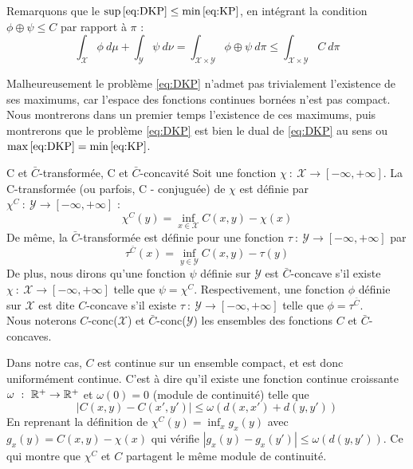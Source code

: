 \documentclass[a4paper,12pt]{article}
\begin{document}
\vspace{0.3cm}

Remarquons que le $\sup\eqref{eq:DKP} \leq \min\eqref{eq:KP}$, en intégrant la condition $\phi\oplus\psi \leq C$ par rapport à $\pi$ : 
$$
\int_{\mathcal{X}} \phi\ d\mu  + \int_{\mathcal{Y}}\psi\ d\nu = \int_{\mathcal{X}\times\mathcal{Y}} \phi\oplus\psi\ d\pi \leq \int_{\mathcal{X}\times\mathcal{Y}} C\ d\pi
$$

Malheureusement le problème \eqref{eq:DKP} n'admet pas trivialement l'existence de ses maximums, car l'espace des fonctions continues bornées n'est pas compact. Nous montrerons dans un premier temps l'existence de ces maximums, puis montrerons que le problème \eqref{eq:DKP} est bien le dual de \eqref{eq:DKP} au sens ou $\max\eqref{eq:DKP} =\min\eqref{eq:KP}$.


\begin{definition}{C et $\bar{C}$-transformée, C et $\bar{C}$-concavité}
Soit une fonction $\chi\ :\ \mathcal{X}\rightarrow [-\infty,+\infty]$. La C-transformée (ou parfois, C - conjuguée) de $\chi$ est définie par $\chi^C\ : \ \mathcal{Y}\rightarrow[-\infty,+\infty]$ : 
$$
\chi^C(y)=\inf_{x\in\mathcal{X}} C(x,y) -\chi(x)
$$
De même, la $\bar{C}$-transformée est définie pour une fonction $\tau\ :\ \mathcal{Y}\rightarrow [-\infty,+\infty]$ par 
$$
\tau^{\bar{C}}(x) = \inf_{y\in\mathcal{Y}} C(x,y) -\tau(y)
$$
De plus, nous dirons qu'une fonction $\psi$ définie sur $\mathcal{Y}$ est $\bar{C}$-concave s'il existe $\chi\ :\ \mathcal{X}\rightarrow [-\infty,+\infty]$ telle que $\psi = \chi^C$. Respectivement, une fonction $\phi$ définie sur $\mathcal{X}$ est dite $C$-concave s'il existe $\tau\ :\ \mathcal{Y}\rightarrow [-\infty,+\infty]$ telle que $\phi=\tau^{\bar{C}}$. \\
Nous noterons $C$-conc($\mathcal{X}$) et $\bar{C}$-conc($\mathcal{Y}$) les ensembles des fonctions $C$ et $\bar{C}$-concaves. 
\end{definition}

Dans notre cas, $C$ est continue sur un ensemble compact, et est donc uniformément continue. C'est à dire qu'il existe une fonction continue croissante $\omega\ :\ \mathbb{R}^+\rightarrow\mathbb{R}^+$ et $\omega(0)=0$ (module de continuité) telle que 
$$
\left|C(x,y) - C(x',y')\right| \leq \omega(d(x,x') + d(y,y'))
$$
En reprenant la définition de $\chi^C(y) = \inf_x g_x(y)$ avec $g_x(y) = C(x,y)-\chi(x)$ qui vérifie $|g_x(y)-g_x(y')|\leq\omega(d(y,y'))$. Ce qui montre que $\chi^C$ et $C$ partagent le même module de continuité. \\
\end{document}
